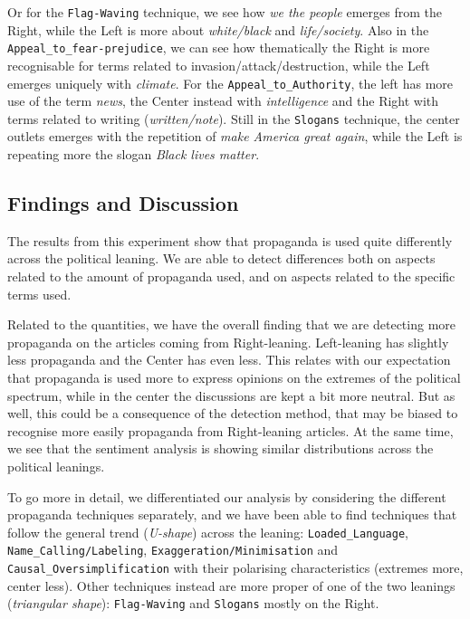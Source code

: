 Or for the \texttt{Flag-Waving} technique, we see how \emph{we the people} emerges from the Right, while the Left is more about \emph{white/black} and \emph{life/society}.
Also in the \texttt{Appeal\_to\_fear-prejudice}, we can see how thematically the Right is more recognisable for terms related to invasion/attack/destruction, while the Left emerges uniquely with \emph{climate}.
For the \texttt{Appeal\_to\_Authority}, the left has more use of the term \emph{news}, the Center instead with \emph{intelligence} and the Right with terms related to writing (\emph{written/note}).
Still in the \texttt{Slogans} technique, the center outlets emerges with the repetition of \emph{make America great again}, while the Left is repeating more the slogan \emph{Black lives matter}.

\subsection{Findings and Discussion}

The results from this experiment show that propaganda is used quite differently across the political leaning.
We are able to detect
differences both on aspects related to the amount of propaganda used, and on aspects related to the specific terms used.

Related to the quantities, we have the overall finding that we are detecting more propaganda on the articles coming from Right-leaning.
Left-leaning has slightly less propaganda and the Center has even less.
This relates with our expectation that propaganda is used more to express opinions on the extremes of the political spectrum, while in the center the discussions are kept a bit more neutral.
But as well, this could be a consequence of the detection method, that may be biased to recognise more easily propaganda from Right-leaning articles.
At the same time, we see that the sentiment analysis is showing similar distributions across the political leanings.

To go more in detail, we differentiated our analysis by considering the different propaganda techniques separately, and we have been able to find techniques that follow the general trend (\emph{U-shape}) across the leaning: \texttt{Loaded\_Language}, \texttt{Name\_Calling/Labeling}, \texttt{Exaggeration/Minimisation} and \texttt{Causal\_Oversimplification} with their polarising characteristics (extremes more, center less). Other techniques instead are more proper of one of the two leanings (\emph{triangular shape}): \texttt{Flag-Waving} and \texttt{Slogans} mostly on the Right. 



